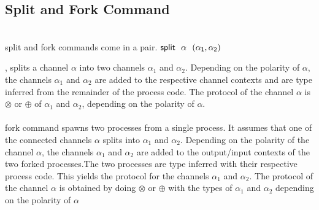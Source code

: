 \documentclass[11pt]{article}
\newcommand{\splitC}
    {
     \ensuremath{{\sf split ~~\alpha~~ (\alpha_1,\alpha_2)}}
     \xspace
    }
\begin{document}
\subsection {Split and Fork Command}
~~\\
{\sf split } and {\sf fork} commands come in a pair.\splitC, splits a channel $\alpha$ into two channels $\alpha_1$ and $\alpha_2$. Depending on the polarity of $\alpha$, the channels $\alpha_1$ and $\alpha_2$ are added to the respective channel contexts and are type inferred from the remainder of the process code. The protocol of the channel $\alpha$ is $\otimes$ or $\oplus$ of $\alpha_1$ and $\alpha_2$, depending on the polarity of $\alpha$.
~~\\~~\\  
{\sf fork} command spawns two processes from a single process. It assumes that one of the connected channels $\alpha$ splits into $\alpha_1$ and $\alpha_2$. Depending on the polarity of the channel $\alpha$, the channels $\alpha_1$ and $\alpha_2$ are added to the output/input contexts of the two forked processes.The two processes are type inferred with their respective process code. This yields the protocol for the channels $\alpha_1$ and $\alpha_2$. The protocol of the channel $\alpha$ is obtained by doing $\otimes$ or $\oplus$ with the types of $\alpha_1$ and $\alpha_2$ depending on the polarity of $\alpha$
\end{document}
